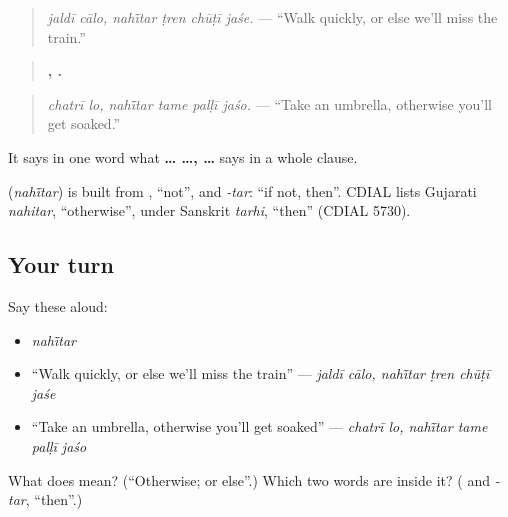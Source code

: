 \begin{quote}
\emph{jaldī cālo, nahī̃tar ṭren chūṭī jaśe.} — \textquotedblleft{}Walk quickly, or else we'll miss the train.\textquotedblright{}
\end{quote}

\begin{quote}
\textbf{ ,    .}
\end{quote}

\begin{quote}
\emph{chatrī lo, nahī̃tar tame palḷī jaśo.} — \textquotedblleft{}Take an umbrella, otherwise you'll get soaked.\textquotedblright{}
\end{quote}

It says in one word what \textbf{ …  …,  …} says in a whole clause.

\begin{cousinweb}
\textbf{} (\emph{nahī̃tar}) is built from \textbf{}, \textquotedblleft{}not\textquotedblright{}, and \emph{-tar}: \textquotedblleft{}if not, then\textquotedblright{}. CDIAL lists Gujarati \emph{nahitar}, \textquotedblleft{}otherwise\textquotedblright{}, under Sanskrit \emph{tarhi}, \textquotedblleft{}then\textquotedblright{} (CDIAL 5730).
\end{cousinweb}

\subsection*{Your turn}
Say these aloud:

\begin{itemize}
\raggedright
  \item \emph{nahī̃tar}
  \item \textquotedblleft{}Walk quickly, or else we'll miss the train\textquotedblright{} — \emph{jaldī cālo, nahī̃tar ṭren chūṭī jaśe}
  \item \textquotedblleft{}Take an umbrella, otherwise you'll get soaked\textquotedblright{} — \emph{chatrī lo, nahī̃tar tame palḷī jaśo}
\end{itemize}

\begin{tcolorbox}[breakable,colback=teal!4,colframe=teal!35!black,title={Before you move on}]
What does \textbf{} mean? (\textquotedblleft{}Otherwise; or else\textquotedblright{}.) Which two words are inside it? (\textbf{} and \emph{-tar}, \textquotedblleft{}then\textquotedblright{}.)
\end{tcolorbox}
